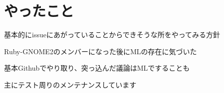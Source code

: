 \section{やったこと}

\begin{frame}
\begin{itemize}
{\Large
\item 基本的にissueにあがっていることからできそうな所をやってみる方針
\item Ruby-GNOME2のメンバーになった後にMLの存在に気づいた
\item 基本Githubでやり取り、突っ込んだ議論はMLですることも
\item 主にテスト周りのメンテナンスしています
}
\end{itemize}
\end{frame}
